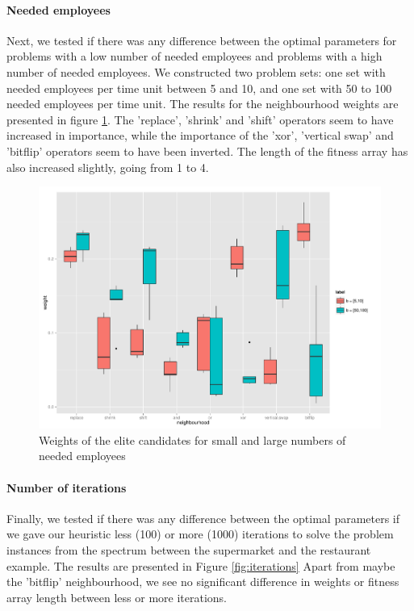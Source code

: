 \documentclass[]{article}
\begin{document}
\paragraph{Needed employees}
Next, we tested if there was any difference between the optimal parameters for problems with a low number of needed employees and problems with a high number of needed employees.
We constructed two problem sets: one set with needed employees per time unit between 5 and 10, and one set with 50 to 100 needed employees per time unit. The results for the neighbourhood weights are presented in figure \ref{fig:b}. The 'replace', 'shrink' and 'shift' operators seem to have increased in importance, while the importance of the 'xor', 'vertical swap' and 'bitflip' operators seem to have been inverted. The length of the fitness array has also increased slightly, going from 1 to 4.

\begin{figure}
	\includegraphics[width=\textwidth]{boxplot_b.pdf}
	\caption{Weights of the elite candidates for small and large numbers of needed employees}
	\label{fig:b}
\end{figure}

\paragraph{Number of iterations}
Finally, we tested if there was any difference between the optimal parameters if we gave our heuristic less (100) or more (1000) iterations to solve the problem instances from the spectrum between the supermarket and the restaurant example. The results are presented in Figure \ref{fig:iterations} Apart from maybe the 'bitflip' neighbourhood, we see no significant difference in weights or fitness array length between less or more iterations.
\end{document}
